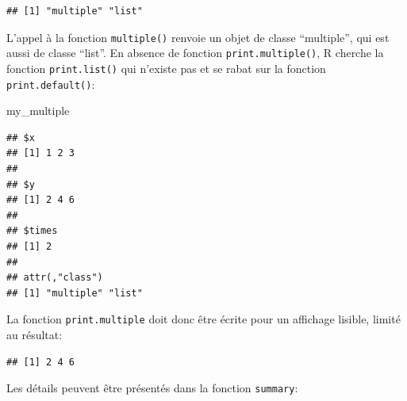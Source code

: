 \documentclass[
  12pt,
  french,
  a4paper,
  extrafontsizes,onecolumn,openright
  ]{memoir}
\newenvironment{Shaded}{\begin{snugshade}}{\end{snugshade}}
\newcommand{\CommentTok}[1]{\textcolor[rgb]{0.56,0.35,0.01}{\textit{#1}}}
\newcommand{\ControlFlowTok}[1]{\textcolor[rgb]{0.13,0.29,0.53}{\textbf{#1}}}
\newcommand{\FunctionTok}[1]{\textcolor[rgb]{0.13,0.29,0.53}{\textbf{#1}}}
\newcommand{\NormalTok}[1]{#1}
\newcommand{\OtherTok}[1]{\textcolor[rgb]{0.56,0.35,0.01}{#1}}
\newcommand{\SpecialCharTok}[1]{\textcolor[rgb]{0.81,0.36,0.00}{\textbf{#1}}}
\newcommand{\StringTok}[1]{\textcolor[rgb]{0.31,0.60,0.02}{#1}}
\begin{document}
\begin{verbatim}
## [1] "multiple" "list"
\end{verbatim}

\normalsize

L'appel à la fonction \texttt{multiple()} renvoie un objet de classe \enquote{multiple}, qui est aussi de classe \enquote{list}.
En absence de fonction \texttt{print.multiple()}, R cherche la fonction \texttt{print.list()} qui n'existe pas et se rabat sur la fonction \texttt{print.default()}:

\scriptsize

\begin{Shaded}
\begin{Highlighting}[]
\NormalTok{my\_multiple}
\end{Highlighting}
\end{Shaded}

\begin{verbatim}
## $x
## [1] 1 2 3
## 
## $y
## [1] 2 4 6
## 
## $times
## [1] 2
## 
## attr(,"class")
## [1] "multiple" "list"
\end{verbatim}

\normalsize

La fonction \texttt{print.multiple} doit donc être écrite pour un affichage lisible, limité au résultat:

\scriptsize

\begin{Shaded}
\end{Shaded}

\begin{verbatim}
## [1] 2 4 6
\end{verbatim}

\normalsize

Les détails peuvent être présentés dans la fonction \texttt{summary}:

\scriptsize

\begin{Shaded}
\end{Shaded}
\end{document}
